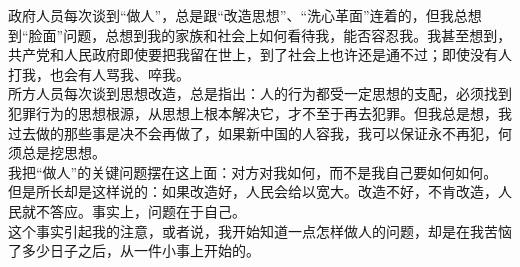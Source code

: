 政府人员每次谈到“做人”，总是跟“改造思想”、“洗心革面”连着的，但我总想到“脸面”问题，总想到我的家族和社会上如何看待我，能否容忍我。我甚至想到，共产党和人民政府即使要把我留在世上，到了社会上也许还是通不过；即使没有人打我，也会有人骂我、啐我。\\

所方人员每次谈到思想改造，总是指出：人的行为都受一定思想的支配，必须找到犯罪行为的思想根源，从思想上根本解决它，才不至于再去犯罪。但我总是想，我过去做的那些事是决不会再做了，如果新中国的人容我，我可以保证永不再犯，何须总是挖思想。\\

我把“做人”的关键问题摆在这上面：对方对我如何，而不是我自己要如何如何。\\

但是所长却是这样说的：如果改造好，人民会给以宽大。改造不好，不肯改造，人民就不答应。事实上，问题在于自己。\\

这个事实引起我的注意，或者说，我开始知道一点怎样做人的问题，却是在我苦恼了多少日子之后，从一件小事上开始的。